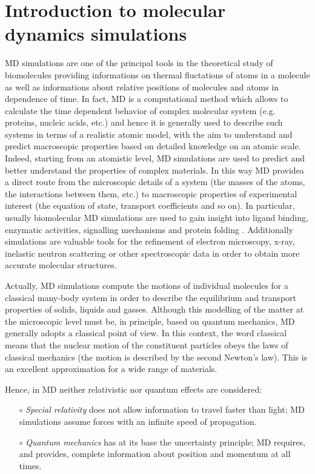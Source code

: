 \section{Introduction to molecular dynamics simulations}
MD simulations are one of the principal tools in the theoretical study of biomolecules providing informations on thermal fluctations of atoms in a molecule as well as informations about relative positions of molecules and atoms in dependence of time. In fact, MD is a computational method which allows to calculate the time dependent behavior of complex molecular system (e.g. proteins, nucleic acids, etc.) and hence it is generally used to describe such systems in terms of a realistic atomic model, with the aim to understand and predict macroscopic properties based on detailed knowledge on an atomic scale. Indeed, starting from an atomistic level, MD simulations are used to predict and better understand the properties of complex materials. In this way MD providea a direct route from the microscopic details of a system (the masses of the atoms, the interactions between them, etc.) to macroscopic properties of experimental interest (the equation of state, transport coefficients and so on). In particular, usually biomolecular MD simulations are used to gain insight into ligand binding, enzymatic activities, signalling mechanisms and protein folding \cite{ref:NAMD-VMD_Kukol}. Additionally simulations are valuable tools for the refinement of electron microscopy, x-ray, inelastic neutron scattering or other spectroscopic data in order to obtain more accurate molecular structures.

Actually, MD simulations compute the motions of individual molecules for a classical many-body system in order to describe the equilibrium and transport properties of solids, liquids and gasses.
Although this modelling of the matter at the microscopic level must be, in principle, based on quantum mechanics, MD generally adopts a classical point of view.
In this context, the word classical means that the nuclear motion of the constituent particles obeys the laws of classical mechanics (the motion is described by the second Newton's law).
This is an excellent approximation for a wide range of materials.

Hence, in MD neither relativistic nor quantum effects are considered:
\begin{itemize}
\item[$\circ$] \textit{Special relativity} does not allow information to travel faster than light; MD simulations assume forces with an infinite speed of propagation.
\item[$\circ$] \textit{Quantum mechanics} has at its base the uncertainty principle; MD requires, and provides, complete information about position and momentum at all times.
\end{itemize}

